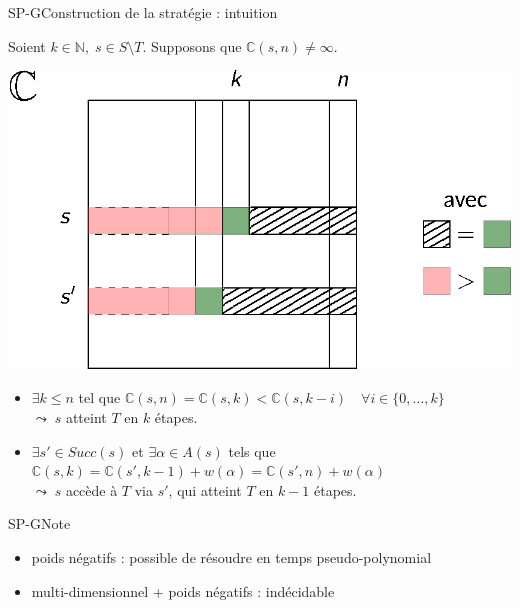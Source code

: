 \documentclass[compress]{beamer}
\theoremstyle{theorem}%
\begin{document}
\begin{frame}{SP-G}{Construction de la stratégie : intuition}
\small

Soient $k \in \mathbb{N}, \; s \in S \setminus T$. Supposons que $\mathbb{C}(s, n) \neq \infty$.
\begin{center}
  \includegraphics[width=0.5\linewidth]{resources/sp-proof}
\end{center}
\begin{itemize}
  \item $\exists k \leq n$ tel que
$ \mathbb{C}(s, n) = \mathbb{C}(s, k) < \mathbb{C}(s, k-i) \quad \forall i \in \{0, \dots, k\}$ \\
  $\leadsto \; s$ atteint $T$ en $k$ étapes.
  \item $\exists s' \in Succ(s)$ et $\exists \alpha \in A(s)$ tels que $\mathbb{C}(s, k) = \mathbb{C}(s', k-1) + w(\alpha) = \mathbb{C}(s', n) + w(\alpha)$\\
  $\leadsto \; s$ accède à $T$ via $s'$, qui atteint $T$ en $k-1$ étapes.
\end{itemize}

\end{frame}

\begin{frame}{SP-G}{Note}
  \begin{itemize}
    \item poids négatifs : \alert{possible de résoudre en temps pseudo-polynomial}
    \item multi-dimensionnel + poids négatifs : \alert{indécidable}
  \end{itemize}
\end{frame}
\end{document}
